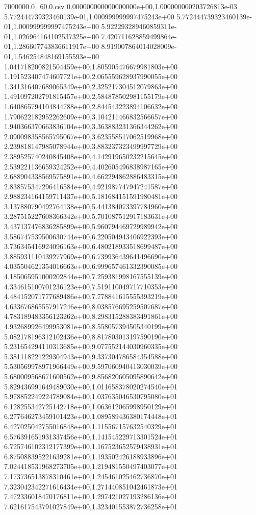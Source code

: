 \begin{filecontents*}{7000000.0_60.0.csv}
0.000000000000000000e+00,1.000000000203726813e-03
5.772444739323460139e-01,1.000999999997475243e+00
5.772444739323460139e-01,1.000999999997475243e+00
5.922293289460859311e-01,1.026964164102537325e+00
7.420711628859499864e-01,1.286607743836611917e+00
8.919007864014028009e-01,1.546254848169155593e+00
1.041718200821504459e+00,1.805905476679981803e+00
1.191523407474607721e+00,2.065559628937990055e+00
1.341316407689065349e+00,2.325217304512079863e+00
1.491097202791815457e+00,2.584878502981155179e+00
1.640865794104844788e+00,2.844543223894106632e+00
1.790622182952262609e+00,3.104211466832566657e+00
1.940366370663836104e+00,3.363883231366344262e+00
2.090098358565795067e+00,3.623558517062519968e+00
2.239818147985078944e+00,3.883237323499997729e+00
2.389525740240845408e+00,4.142919650232215645e+00
2.539221136659324252e+00,4.402605496838987165e+00
2.688904338569575891e+00,4.662294862886483315e+00
2.838575347296416584e+00,4.921987747947241587e+00
2.988234164159711437e+00,5.181684151591980481e+00
3.137880790492764138e+00,5.441384073397784960e+00
3.287515227608366342e+00,5.701087512917183631e+00
3.437137476836285899e+00,5.960794469729989942e+00
3.586747539500630744e+00,6.220504943406922393e+00
3.736345416924096163e+00,6.480218933518699487e+00
3.885931110439277969e+00,6.739936439641496690e+00
4.035504621354016663e+00,6.999657461332390085e+00
4.185065951000202844e+00,7.259381998167555139e+00
4.334615100701236123e+00,7.519110049717710353e+00
4.484152071777689486e+00,7.778841615555393219e+00
4.633676865557917246e+00,8.038576695259507687e+00
4.783189483356123262e+00,8.298315288383491861e+00
4.932689926499953081e+00,8.558057394505340199e+00
5.082178196312102436e+00,8.817803013197590190e+00
5.231654294110313685e+00,9.077552144030960335e+00
5.381118221229304943e+00,9.337304786584354588e+00
5.530569978971966449e+00,9.597060940413030039e+00
5.680009568671600562e+00,9.856820605095890642e+00
5.829436991649489030e+00,1.011658378020274540e+01
5.978852249224789084e+00,1.037635046530795080e+01
6.128255342725142718e+00,1.063612065998950129e+01
6.277646273459101423e+00,1.089589436380174448e+01
6.427025042755016848e+00,1.115567157632540329e+01
6.576391651931337456e+00,1.141545229713301524e+01
6.725746102312177399e+00,1.167523652579438931e+01
6.875088395221639281e+00,1.193502426188933896e+01
7.024418531968273705e+00,1.219481550497403077e+01
7.173736513878310461e+00,1.245461025462736870e+01
7.323042342271616434e+00,1.271440851042461873e+01
7.472336018470176811e+00,1.297421027193286136e+01
7.621617543791027849e+00,1.323401553872736258e+01

\end{filecontents*}
